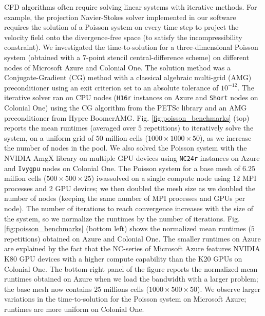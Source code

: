\documentclass[10pt,journal,compsoc]{IEEEtran}
\begin{document}
CFD algorithms often require solving linear systems with iterative methods.
For example, the projection Navier-Stokes solver implemented in our software requires the solution of a Poisson system on every time step to project the velocity field onto the divergence-free space (to satisfy the incompressibility constraint).
We investigated the time-to-solution for a three-dimensional Poisson system (obtained with a 7-point stencil central-difference scheme) on different nodes of Microsoft Azure and Colonial One.
The solution method was a Conjugate-Gradient (CG) method with a classical algebraic multi-grid (AMG) preconditioner using an exit criterion set to an absolute tolerance of $10^{-12}$.
The iterative solver ran on CPU nodes (\texttt{H16r} instances on Azure and \texttt{Short} nodes on Colonial One) using the CG algorithm from the PETSc library\cite{balay_et_al_2018} and an AMG preconditioner from Hypre BoomerAMG.
Fig. \ref{fig:poisson_benchmarks} (top) reports the mean runtimes (averaged over $5$ repetitions) to iteratively solve the system, on a uniform grid of $50$ million cells ($1000 \times 1000 \times 50$), as we increase the number of nodes in the pool.
We also solved the Poisson system with the NVIDIA AmgX library on multiple GPU devices using \texttt{NC24r} instances on Azure and \texttt{Ivygpu} nodes on Colonial One.
The Poisson system for a base mesh of $6.25$ million cells ($500 \times 500 \times 25$) iwassolved on a single compute node using $12$ MPI processes and $2$ GPU devices; we then doubled the mesh size as we doubled the number of nodes (keeping the same number of MPI processes and GPUs per node).
The number of iterations to reach convergence increases with the size of the system, so we normalize the runtimes by the number of iterations.
Fig. \ref{fig:poisson_benchmarks} (bottom left) shows the normalized mean runtimes ($5$ repetitions) obtained on Azure and Colonial One.
The smaller runtimes on Azure are explained by the fact that the NC-series of Microsoft Azure features NVIDIA K80 GPU devices with a higher compute capability than the K20 GPUs on Colonial One.
The bottom-right panel of the figure reports the normalized mean runtimes obtained on Azure when we load the bandwidth with a larger problem; the base mesh now contains $25$ millions cells ($1000 \times 500 \times 50$).
We observe larger variations in the time-to-solution for the Poisson system on Microsoft Azure; runtimes are more uniform on Colonial One.
\end{document}
